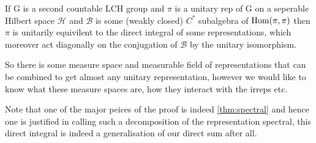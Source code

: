 \documentclass[10pt, openany]{book}
\numberwithin{equation}{section}
\begin{document}
\begin{Theorem}
	If G is a second countable LCH group and \(\pi\) is a unitary rep of G on a seperable Hilbert space \(\mathcal{H}\) and \(\mathcal{B}\) is some (weakly closed) \(C^*\) subalgebra of \(\operatorname{Hom}(\pi, \pi)\) then \(\pi\) is unitarily equivilent to the direct integral of some representations, which moreover act diagonally on the conjugation of \(\mathcal{B}\) by the unitary isomorphism. 
\end{Theorem}
So there is some measure space and measurable field of representations that can be combined to get almost any unitary representation, however we would like to know what these measure spaces are, how they interact with the irreps etc.

Note that one of the major peices of the proof is indeed \ref{thm:spectral} and hence one is justified in calling such a decomposition of the representation spectral, this direct integral is indeed a generalisation of our direct sum after all.

\newpage


\end{document}
